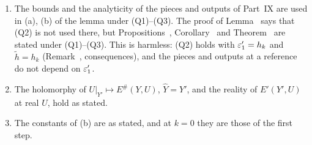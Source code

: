 \begin{detail}\label{xb:d-rawnew}
\begin{enumerate}[label=(\alph*)]
\item The bounds and the analyticity of the pieces and outputs of Part~IX are used in (a), (b) of the lemma under (Q1)--(Q3). The proof of Lemma~ says that (Q2) is not used there, but Propositions~, Corollary~ and Theorem~ are stated under (Q1)--(Q3). This is harmless: (Q2) holds with $\varepsilon'_1=h_k$ and $\tilde h=h_k$ (Remark~, consequences), and the pieces and outputs at a reference do not depend on $\varepsilon'_1$.
\item The holomorphy of $U|_{Y'}\mapsto E^\#(Y,U)$, $\hat Y=Y'$, and the reality of $E'(Y',U)$ at real $U$, hold as stated.
\item The constants of (b) are as stated, and at $k=0$ they are those of the first step.
\end{enumerate}
\end{detail}

